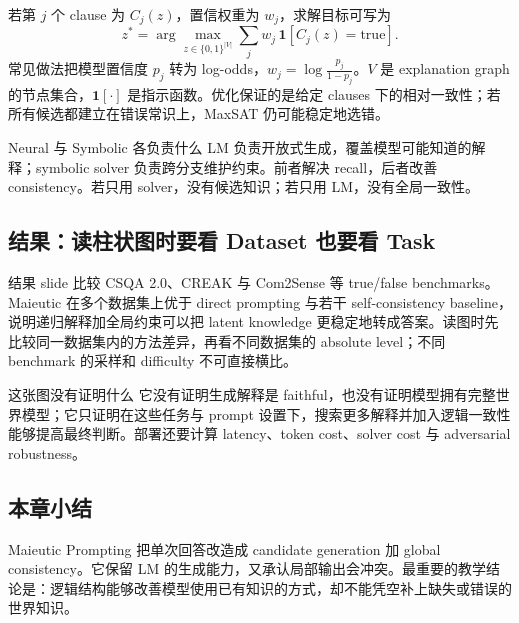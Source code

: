 
若第 $j$ 个 clause 为 $C_j(z)$，置信权重为 $w_j$，求解目标可写为
\begin{equation}
z^*=\arg\max_{z\in\{0,1\}^{|V|}}
\sum_j w_j\,\mathbf{1}\!\left[C_j(z)=\mathrm{true}\right].
\end{equation}
常见做法把模型置信度 $p_j$ 转为 log-odds，$w_j=\log\frac{p_j}{1-p_j}$。$V$ 是 explanation graph 的节点集合，$\mathbf{1}[\cdot]$ 是指示函数。优化保证的是给定 clauses 下的相对一致性；若所有候选都建立在错误常识上，MaxSAT 仍可能稳定地选错。

\begin{knowledgebox}{Neural 与 Symbolic 各负责什么}
LM 负责开放式生成，覆盖模型可能知道的解释；symbolic solver 负责跨分支维护约束。前者解决 recall，后者改善 consistency。若只用 solver，没有候选知识；若只用 LM，没有全局一致性。
\end{knowledgebox}

\subsection{结果：读柱状图时要看 Dataset 也要看 Task}

结果 slide 比较 CSQA 2.0、CREAK 与 Com2Sense 等 true/false benchmarks。Maieutic 在多个数据集上优于 direct prompting 与若干 self-consistency baseline，说明递归解释加全局约束可以把 latent knowledge 更稳定地转成答案。读图时先比较同一数据集内的方法差异，再看不同数据集的 absolute level；不同 benchmark 的采样和 difficulty 不可直接横比。


\begin{warningbox}{这张图没有证明什么}
它没有证明生成解释是 faithful，也没有证明模型拥有完整世界模型；它只证明在这些任务与 prompt 设置下，搜索更多解释并加入逻辑一致性能够提高最终判断。部署还要计算 latency、token cost、solver cost 与 adversarial robustness。
\end{warningbox}

\subsection{本章小结}

Maieutic Prompting 把单次回答改造成 candidate generation 加 global consistency。它保留 LM 的生成能力，又承认局部输出会冲突。最重要的教学结论是：逻辑结构能够改善模型使用已有知识的方式，却不能凭空补上缺失或错误的世界知识。

